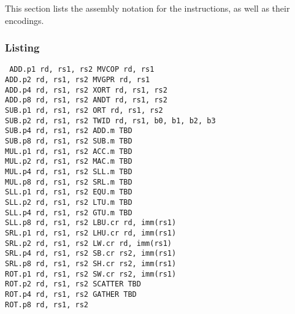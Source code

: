 This section lists the assembly notation for the instructions, as well as
their encodings.

\subsubsection{Listing}

{\tt
ADD.p1  rd, rs1, rs2 \quad\quad\quad MVCOP   rd, rs1                 \\
ADD.p2  rd, rs1, rs2 \quad\quad\quad MVGPR   rd, rs1                 \\
ADD.p4  rd, rs1, rs2 \quad\quad\quad XORT    rd, rs1, rs2            \\
ADD.p8  rd, rs1, rs2 \quad\quad\quad ANDT    rd, rs1, rs2            \\
SUB.p1  rd, rs1, rs2 \quad\quad\quad ORT     rd, rs1, rs2            \\
SUB.p2  rd, rs1, rs2 \quad\quad\quad TWID    rd, rs1, b0, b1, b2, b3 \\
SUB.p4  rd, rs1, rs2 \quad\quad\quad ADD.m   TBD                     \\
SUB.p8  rd, rs1, rs2 \quad\quad\quad SUB.m   TBD                     \\
MUL.p1  rd, rs1, rs2 \quad\quad\quad ACC.m   TBD                     \\
MUL.p2  rd, rs1, rs2 \quad\quad\quad MAC.m   TBD                     \\
MUL.p4  rd, rs1, rs2 \quad\quad\quad SLL.m   TBD                     \\
MUL.p8  rd, rs1, rs2 \quad\quad\quad SRL.m   TBD                     \\
SLL.p1  rd, rs1, rs2 \quad\quad\quad EQU.m   TBD                     \\
SLL.p2  rd, rs1, rs2 \quad\quad\quad LTU.m   TBD                     \\
SLL.p4  rd, rs1, rs2 \quad\quad\quad GTU.m   TBD                     \\
SLL.p8  rd, rs1, rs2 \quad\quad\quad LBU.cr  rd, imm(rs1)            \\
SRL.p1  rd, rs1, rs2 \quad\quad\quad LHU.cr  rd, imm(rs1)            \\
SRL.p2  rd, rs1, rs2 \quad\quad\quad LW.cr   rd, imm(rs1)            \\
SRL.p4  rd, rs1, rs2 \quad\quad\quad SB.cr   rs2, imm(rs1)           \\
SRL.p8  rd, rs1, rs2 \quad\quad\quad SH.cr   rs2, imm(rs1)           \\
ROT.p1  rd, rs1, rs2 \quad\quad\quad SW.cr   rs2, imm(rs1)           \\
ROT.p2  rd, rs1, rs2 \quad\quad\quad SCATTER TBD                     \\
ROT.p4  rd, rs1, rs2 \quad\quad\quad GATHER  TBD                     \\
ROT.p8  rd, rs1, rs2 \quad\quad\quad 
}

